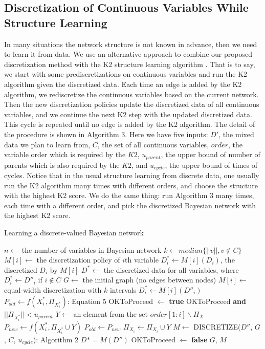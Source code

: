 \subsection{Discretization of Continuous Variables While Structure Learning}
\label{SL}
In many situations the network structure is not known in advance, then we need to learn it from data. We use an alternative approach to combine our proposed discretization method with the K2 structure learning algorithm \citep{K2}. That is to say, we start with some prediscretizations on continuous variables and run the K2 algorithm given the discretized data. Each time an edge is added by the K2 algorithm, we rediscretize the continuous variables based on the current network. Then the new discretization policies update the discretized data of all continuous variables, and we continue the next K2 step with the updated discretized data. This cycle is repeated until no edge is added by the K2 algorithm. The detail of the procedure is shown in Algorithm 3. Here we have five inputs: $D'$, the mixed data we plan to learn from, $C$, the set of all continuous variables, $order$, the variable order which is required by the $K2$, $u_{parent}$, the upper bound of number of parents which is also required by the $K2$, and $u_{cycle}$, the upper bound of times of cycles. Notice that in the usual structure learning from discrete data, one usually run the K2 algorithm many times with different orders, and choose the structure with the highest K2 score. We do the same thing: run Algorithm 3 many times, each time with a different order, and pick the discretized Bayesian network with the highest K2 score.
\begin{algorithm}
\caption{ Learning a discrete-valued Bayesian network}
\begin{algorithmic}[5]
\State

\State $n \leftarrow$ the number of variables in Bayesian network
\State $k \leftarrow median\{ ||v||, v\notin C\}$
\State $M[i] \leftarrow$ the discretization policy of $i$th variable
\State $D^*_i \leftarrow M[i] (D_i)$, the discretized $D_i$ by $M[i]$
\State $D^* \leftarrow $ the discretized data for all variables, where $D^*_i \leftarrow D''_i$ if $i \notin C$
\State $G \leftarrow$ the initial graph (no edges between nodes)
\State
{}
\State $M[i] \leftarrow$  equal-width discretization with $k$ intervals
\State $D^*_i \leftarrow  M[i] (D''_i)$
\EndIf
\EndFor
\State
{}
\State $P_{old} \leftarrow f(X^*_i,\Pi_{X^*_i})$: Equation 5
\State OKToProceed $\leftarrow$ \textbf{true}
\While OKToProceed \textbf{and} $||\Pi_{X^*_i}|| < u_{parent}$
\State $Y \leftarrow$ an element from the set $order[1:i] \backslash \Pi_X$
\State $P_{new} \leftarrow f(X^*_i,\Pi_{X^*_i} \cup Y)$
\State $P_{old} \leftarrow P_{new}$
\State $\Pi_{X_i} \leftarrow \Pi_{X_i} \cup Y $
\State $M \leftarrow$ {DISCRETIZE}({$D''$, $G$, $C$, $u_{cycle}$}): Algorithm 2
\State $D* = M(D'')$
\Else
\State OKToProceed $\leftarrow$ \textbf{false}
\EndIf
\EndWhile
\EndFor
\State \Return $G$, $M$
\EndFunction
\end{algorithmic}
\end{algorithm}


